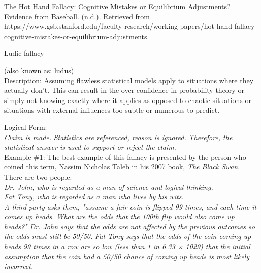 \documentclass[a4paper,12pt,single,pdftex]{scrbook}
\begin{document}
      
        
          The Hot Hand Fallacy: Cognitive Mistakes or Equilibrium Adjustments? Evidence from Baseball. (n.d.). Retrieved from https://www.gsb.stanford.edu/faculty-research/working-papers/hot-hand-fallacy-cognitive-mistakes-or-equilibrium-adjustments
        
      
    
  

Ludic fallacy
    
      (also known as: ludus)
    \\

  
    Description: Assuming flawless statistical models apply to situations where they actually don’t.  This can result in the over-confidence in probability theory or simply not knowing exactly where it applies as opposed to chaotic situations or situations with external influences too subtle or numerous to predict.

    
      Logical Form:
    \\

    
      {\em Claim is made.} \newline
{\em Statistics are referenced, reason is ignored.} \newline
{\em Therefore, the statistical answer is used to support or reject the claim.}
    \\

    
      Example \#1: The best example of this fallacy is presented by the person who coined this term, Nassim Nicholas Taleb in his 2007 book, {\it The Black Swan}.  There are two people:
    \\

    
      {\em Dr. John, who is regarded as a man of science and logical thinking.}
    \\

    
      {\em Fat Tony, who is regarded as a man who lives by his wits.}
    \\

    
      {\em A third party asks them, "assume a fair coin is flipped 99 times, and each time it comes up heads. What are the odds that the 100th flip would also come up heads?"  Dr. John says that the odds are not affected by the previous outcomes so the odds must still be 50/50.  Fat Tony says that the odds of the coin coming up heads 99 times in a row are so low (less than 1 in 6.33 × 1029) that the initial assumption that the coin had a 50/50 chance of coming up heads is most likely incorrect.}
    \\
\end{document}
